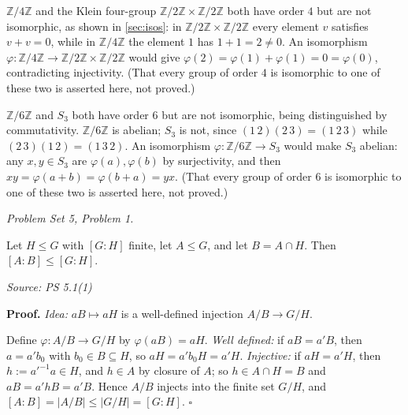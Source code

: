 \documentclass[11pt]{report}
\renewenvironment{proof}[1][Proof]{\noindent\textbf{#1.} }{\hfill$\square$\par\vspace{5pt}}
\newcommand{\srcline}[1]{\par\hfill{\footnotesize\textit{Source: #1}}}
\begin{document}
\begin{exbox}\label{ex:lagrange-two-groups-order-4}
$\mathbb{Z}/4\mathbb{Z}$ and the Klein four-group $\mathbb{Z}/2\mathbb{Z} \times \mathbb{Z}/2\mathbb{Z}$ both have order $4$ but are not isomorphic, as shown in \ref{sec:isos}: in $\mathbb{Z}/2\mathbb{Z} \times \mathbb{Z}/2\mathbb{Z}$ every element $v$ satisfies $v + v = 0$, while in $\mathbb{Z}/4\mathbb{Z}$ the element $1$ has $1 + 1 = 2 \neq 0$. An isomorphism $\varphi: \mathbb{Z}/4\mathbb{Z} \to \mathbb{Z}/2\mathbb{Z} \times \mathbb{Z}/2\mathbb{Z}$ would give $\varphi(2) = \varphi(1) + \varphi(1) = 0 = \varphi(0)$, contradicting injectivity. (That every group of order $4$ is isomorphic to one of these two is asserted here, not proved.)
\end{exbox}

\begin{exbox}\label{ex:lagrange-two-groups-order-6}
$\mathbb{Z}/6\mathbb{Z}$ and $S_3$ both have order $6$ but are not isomorphic, being distinguished by commutativity. $\mathbb{Z}/6\mathbb{Z}$ is abelian; $S_3$ is not, since $(1\,2)(2\,3) = (1\,2\,3)$ while $(2\,3)(1\,2) = (1\,3\,2)$. An isomorphism $\varphi: \mathbb{Z}/6\mathbb{Z} \to S_3$ would make $S_3$ abelian: any $x, y \in S_3$ are $\varphi(a), \varphi(b)$ by surjectivity, and then $xy = \varphi(a + b) = \varphi(b + a) = yx$. (That every group of order $6$ is isomorphic to one of these two is asserted here, not proved.)
\end{exbox}
\textit{Problem Set 5, Problem 1.}

\begin{propbox}\label{prop:index-intersection}
Let $H \leq G$ with $[G : H]$ finite, let $A \leq G$, and let $B = A \cap H$. Then $[A : B] \leq [G : H]$.
\srcline{PS 5.1(1)}
\end{propbox}

\begin{proof}
\textit{Idea:} $aB \mapsto aH$ is a well-defined injection $A/B \to G/H$.\par
Define $\varphi: A/B \to G/H$ by $\varphi(aB) = aH$. \emph{Well defined:} if $aB = a'B$, then $a = a'b_0$ with $b_0 \in B \subseteq H$, so $aH = a'b_0H = a'H$. \emph{Injective:} if $aH = a'H$, then $h := a'^{-1}a \in H$, and $h \in A$ by closure of $A$; so $h \in A \cap H = B$ and $aB = a'hB = a'B$. Hence $A/B$ injects into the finite set $G/H$, and $[A : B] = |A/B| \leq |G/H| = [G : H]$.
\end{proof}
\end{document}
